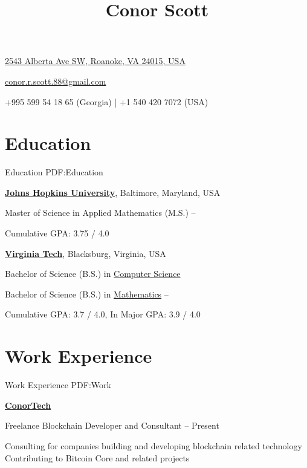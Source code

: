 \documentclass[a4paper,10pt,oneside]{article}
\begin{document}

\title{Conor Scott}

\begin{subtitle}
\href{https://www.google.com/maps/place/2543+Alberta+Ave+SW,+Roanoke,+VA+24015}
{2543 Alberta Ave SW, Roanoke, VA 24015, USA}
\par
\href{mailto:conor.r.scott.88@gmail.com}
{conor.r.scott.88@gmail.com}
\par
+995 599 54 18 65 (Georgia) | +1 540 420 7072 (USA)
\end{subtitle}
\begin{body}


\section
{Education}
{Education}
{PDF:Education}

\href{https://www.jhu.edu/}
{\textbf{Johns Hopkins University}},
Baltimore, Maryland, USA

\SmallEntryGap
Master of Science in Applied Mathematics (M.S.)
\hfill
{} --
\begin{detail}
\BulletItem
Cumulative GPA: 3.75 / 4.0
\end{detail}

\EntryGap
\href{https://www.vt.edu/}
{\textbf{Virginia Tech}},
Blacksburg, Virginia, USA
\par
Bachelor of Science (B.S.) in
\href{https://www.cs.vt.edu/}
{Computer Science}
\par
Bachelor of Science (B.S.) in
\href{https://www.math.vt.edu/}
{Mathematics}
\hfill
{} --
\begin{detail}
\BulletItem
Cumulative GPA: 3.7 / 4.0, In Major GPA: 3.9 / 4.0
\end{detail}

\section
{Work Experience}
{Work Experience}
{PDF:Work}

\href{https://conscott.github.io}
{\textbf{ConorTech}}
\par
Freelance Blockchain Developer and Consultant
\hfill
{} -- Present
\begin{detail}
\BulletItem Consulting for companies building and developing blockchain related technology
\BulletItem Contributing to Bitcoin Core and related projects
\end{detail}



\end{body}
\end{document}
